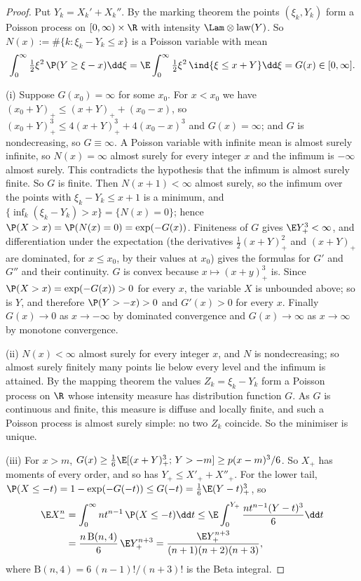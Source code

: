 \begin{proof}
Put $Y_k=X_k'+X_k''$. By the marking theorem the points $(\xi_k,Y_k)$ form a Poisson process
on $[0,\infty)\times\R$ with intensity $\Lam\otimes\mathrm{law}(Y)$. So
$N(x):=\#\{k:\xi_k-Y_k\le x\}$ is a Poisson variable with mean
\[
  \int_0^\infty\tfrac12\xi^2\,\P(Y\ge\xi-x)\dd\xi
  =\E\int_0^\infty\tfrac12\xi^2\,\ind\{\xi\le x+Y\}\dd\xi=G(x)\in[0,\infty] .
\]

(i) Suppose $G(x_0)=\infty$ for some $x_0$. For $x<x_0$ we have
$(x_0+Y)_+\le(x+Y)_++(x_0-x)$, so $(x_0+Y)_+^3\le4(x+Y)_+^3+4(x_0-x)^3$ and $G(x)=\infty$; and
$G$ is nondecreasing, so $G\equiv\infty$. A Poisson variable with infinite mean is almost
surely infinite, so $N(x)=\infty$ almost surely for every integer $x$ and the infimum is
$-\infty$ almost surely. This contradicts the hypothesis that the infimum is almost surely
finite. So $G$ is finite. Then $N(x+1)<\infty$ almost surely, so the infimum over the points
with $\xi_k-Y_k\le x+1$ is a minimum, and $\{\inf_k(\xi_k-Y_k)>x\}=\{N(x)=0\}$; hence
$\P(X>x)=\P(N(x)=0)=\exp(-G(x))$. Finiteness of $G$ gives $\E Y_+^3<\infty$, and
differentiation under the expectation (the derivatives $\tfrac12(x+Y)_+^2$ and $(x+Y)_+$ are
dominated, for $x\le x_0$, by their values at $x_0$) gives the formulas for $G'$ and $G''$ and
their continuity. $G$ is convex because $x\mapsto(x+y)_+^3$ is. Since
$\P(X>x)=\exp(-G(x))>0$ for every $x$, the variable $X$ is unbounded above; so is $Y$, and
therefore $\P(Y>-x)>0$ and $G'(x)>0$ for every $x$. Finally $G(x)\to0$ as $x\to-\infty$ by
dominated convergence and $G(x)\to\infty$ as $x\to\infty$ by monotone convergence.

(ii) $N(x)<\infty$ almost surely for every integer $x$, and $N$ is nondecreasing; so almost
surely finitely many points lie below every level and the infimum is attained. By the mapping
theorem the values $Z_k=\xi_k-Y_k$ form a Poisson process on $\R$ whose intensity measure has
distribution function $G$. As $G$ is continuous and finite, this measure is diffuse and locally
finite, and such a Poisson process is almost surely simple: no two $Z_k$ coincide. So the
minimiser is unique.

(iii) For $x>m$, $G(x)\ge\tfrac16\E[(x+Y)_+^3;\,Y>-m]\ge p(x-m)^3/6$. So $X_+$ has moments of
every order, and so has $Y_+\le X'_++X''_+$. For the lower tail,
$\P(X\le-t)=1-\exp(-G(-t))\le G(-t)=\tfrac16\E(Y-t)_+^3$, so
\begin{align*}
  \E X_-^n&=\int_0^\infty nt^{n-1}\,\P(X\le-t)\dd t
  \le\E\int_0^{Y_+}\frac{nt^{n-1}(Y-t)^3}{6}\dd t\\
  &=\frac{n\,\mathrm{B}(n,4)}{6}\,\E Y_+^{n+3}=\frac{\E Y_+^{n+3}}{(n+1)(n+2)(n+3)} ,
\end{align*}
where $\mathrm{B}(n,4)=6\,(n-1)!/(n+3)!$ is the Beta integral.
\end{proof}

